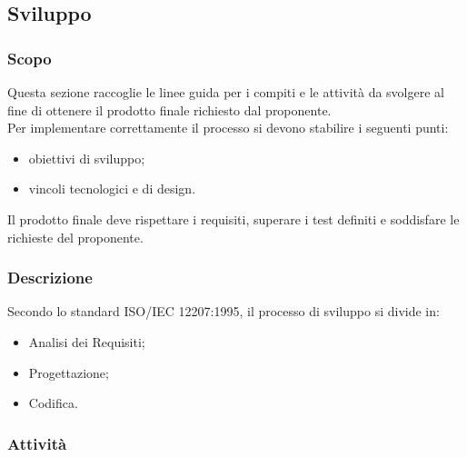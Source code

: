 \subsection{Sviluppo}

	\subsubsection{Scopo}
	Questa sezione raccoglie le linee guida per i compiti e le attività da svolgere al fine di ottenere il prodotto finale richiesto dal proponente. \\
	Per implementare correttamente il processo si devono stabilire i seguenti punti:
	\begin{itemize}
		\item obiettivi di sviluppo;
		\item vincoli tecnologici e di design.
	\end{itemize}
	Il prodotto finale deve rispettare i requisiti, superare i test definiti e soddisfare le richieste del proponente.
	\subsubsection{Descrizione}
	Secondo lo standard ISO/IEC 12207:1995, il processo di sviluppo si divide in:
	\begin{itemize}
		\item Analisi dei Requisiti;
		\item Progettazione;
		\item Codifica.
	\end{itemize}

	\subsubsection{Attività}

